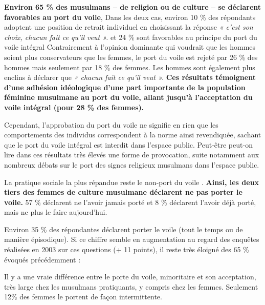 \textbf{Environ 65 \% des musulmans -- de religion ou de culture -- se
déclarent favorables au port du voile}, 
Dans les deux cas,
environ 10 \% des répondants adoptent une position de retrait individuel
en choisissant la réponse \emph{« c'est son choix, chacun fait ce qu'il
veut ».}
et 24 \% sont
favorables au principe du port du voile intégral
Contrairement à l'opinion dominante qui voudrait que les hommes soient
plus conservateurs que les femmes, le port du voile est rejeté par 26 \%
des hommes mais seulement par 18 \% des femmes. Les hommes sont
également plus enclins à déclarer que \emph{« chacun fait ce qu'il veut
».} \textbf{Ces résultats témoignent d'une adhésion idéologique d'une
part importante de la population féminine musulmane au port du voile,
allant jusqu'à l'acceptation du voile intégral (pour 28 \% des femmes).}

Cependant, l'approbation du port du voile ne signifie en rien que les
comportements des individus correspondent à la norme ainsi revendiquée,
sachant que le port du voile intégral est interdit dans l'espace public.
Peut-être peut-on lire dans ces résultats très élevés une forme de
provocation, suite notamment aux nombreux débats sur le port des signes
religieux musulmans dans l'espace public.

La pratique sociale la plus répandue reste le non-port du voile .
\textbf{Ainsi, les deux tiers des femmes de culture musulmane déclarent
ne pas porter le voile.} 57 \% déclarent ne l'avoir jamais porté et 8 \%
déclarent l'avoir déjà porté, mais ne plus le faire aujourd'hui.

Environ 35 \% des répondantes déclarent porter le voile (tout le temps
ou de manière épisodique). Si ce chiffre semble en augmentation au
regard des enquêtes réalisées en 2003 sur ces questions (+ 11 points),
il reste très éloigné des 65 \% évoqués précédemment :

\begin{Synthesis}
Il y a une vraie différence entre le porte du voile, minoritaire et son acceptation, très large chez les musulmans pratiquants, y compris chez les femmes. Seulement 12\% des femmes le portent de façon intermittente.
\end{Synthesis}


